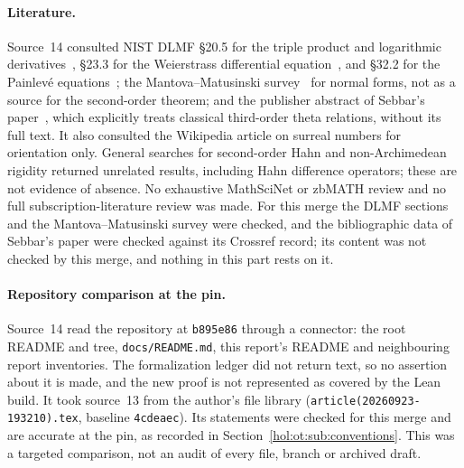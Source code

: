 \documentclass[11pt]{article}
\numberwithin{equation}{section}
\theoremstyle{definition}
\theoremstyle{remark}
\begin{document}
\paragraph{Literature.}
Source~14 consulted NIST DLMF \S20.5 for the triple product and logarithmic
derivatives~\cite{dlmftheta}, \S23.3 for the Weierstrass differential
equation~\cite{dlmfelliptic}, and \S32.2 for the Painlev\'e
equations~\cite{dlmfpainleve}; the Mantova--Matusinski
survey~\cite{mantovamatusinski} for normal forms, not as a source for the
second-order theorem; and the publisher abstract of Sebbar's
paper~\cite{sebbar}, which explicitly treats classical third-order theta
relations, without its full text. It also consulted the Wikipedia article on
surreal numbers for orientation only. General searches for second-order Hahn
and non-Archimedean rigidity returned unrelated results, including Hahn
difference operators; these are not evidence of absence. No exhaustive
MathSciNet or zbMATH review and no full subscription-literature review was
made. For this merge the DLMF sections and the Mantova--Matusinski survey were
checked, and the bibliographic data of Sebbar's paper were checked against
its Crossref record; its content was not checked by this merge, and nothing
in this part rests on it.

\paragraph{Repository comparison at the pin.}
Source~14 read the repository at \texttt{b895e86} through a connector: the
root README and tree, \texttt{docs/README.md}, this report's README and
neighbouring report inventories. The formalization ledger did not return text,
so no assertion about it is made, and the new proof is not represented as
covered by the Lean build. It took source~13 from the author's file library
(\texttt{article(20260923-193210).tex}, baseline \texttt{4cdeaec}). Its
statements were checked for this merge and are accurate at the pin, as
recorded in Section~\ref{hol:ot:sub:conventions}. This was a targeted
comparison, not an audit of every file, branch or archived draft.
\end{document}

